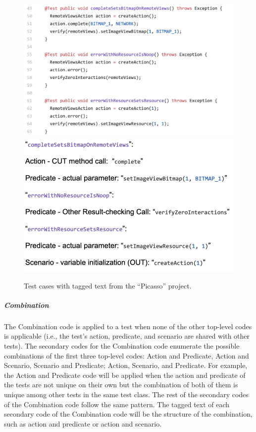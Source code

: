 \begin{figure}[t]
\centering
\includegraphics[scale=0.45]{figures/sp4-proposal.png}
\includegraphics[scale=0.45]{figures/sp2-proposal.png}
\caption{Test cases with tagged text from the \enquote{Picasso} project.}
\label{fig:test2-proposal}
\end{figure}

\subparagraph{Combination}

The Combination code is applied to a test when none of the other top-level codes is applicable (i.e., the test’s action, predicate, and scenario are shared with other tests).
%
The secondary codes for the Combination code enumerate the possible combinations of the first three top-level codes: Action and Predicate, Action and Scenario, Scenario and Predicate; Action, Scenario, and Predicate.
%
For example, the Action and Predicate code will be applied when the action and predicate of the tests are not unique on their own but the combination of both of them is unique among other tests in the same test class.
%
The rest of the secondary codes of the Combination code follow the same pattern. The tagged text of each secondary code of the Combination code will be the structure of the combination, such as action and predicate or action and scenario.


